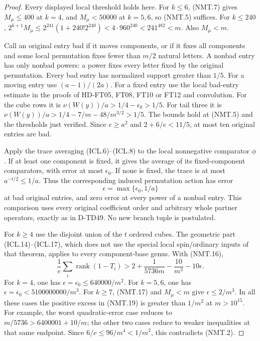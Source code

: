 \begin{proof}
Every displayed local threshold holds here.  For $k\le6$,
(NMT.7) gives $M_\mu\le400$ at $k=4$, and $M_\mu<50000$
at $k=5,6$, so (NMT.5) suffices.
For $k\le240$,
$2^{k+1}M_\mu\le2^{241}(1+240!2^{240})
<4\cdot960^{240}<241^{482}<m$.
Also $M_\mu<m$.

Call an original entry bad if it moves components, or if it
fixes all components and some local permutation fixes fewer
than $m/2$ natural letters.  A nonbad entry has only nonbad
powers: a power fixes every letter fixed by the original
permutation.  Every bad entry has normalized support greater
than $1/5$.  For a moving entry use $(a-1)/(2a)$.
For a fixed entry use the local bad-entry estimate in the
proofs of HD-FT05, FT08, FT10 or FT12 and convolution.
For the cube rows it is
$\nu(W(y))/a>1/4-\epsilon_0>1/5$.
For tail three it is
$\nu(W(y))/a>1/4-7/m-48/m^{3/2}>1/5$.
The bounds hold at (NMT.5) and the thresholds just verified.
Since $e\ge a^2$ and $2+6/e<11/5$, at most ten original
entries are bad.

Apply the trace averaging (ICL.6)--(ICL.8) to the local
nonnegative comparator $\phi$.  If at least one component
is fixed, it gives the average of its fixed-component
comparators, with error at most $\epsilon_0$.
If none is fixed, the trace is at most $a^{-t/2}\le1/a$.
Thus the corresponding induced permutation action has error
\[
                 \epsilon=\max\{\epsilon_0,1/a\}
 \tag{NMT.18}
\]
at bad original entries, and zero error at every power of
a nonbad entry.  This comparison uses every original
coefficient order and arbitrary whole partner operators,
exactly as in D-TD49.  No new branch tuple is postulated.

For $k\ge4$ use the disjoint union of the $t$ ordered cubes.
The geometric part (ICL.14)--(ICL.17), which does not use
the special local spin/ordinary inputs of that theorem,
applies to every component-base genus.  With (NMT.16),
\[
 \frac1e\sum_i\operatorname{rank}(1-T_i)
 >2+\frac1{5736m}-\frac{10}{m^3}-10\epsilon.
 \tag{NMT.19}
\]
For $k=4$, one has $\epsilon=\epsilon_0\le640000/m^2$.
For $k=5,6$, one has $\epsilon=\epsilon_0<5100000000/m^3$.
For $k\ge7$, (NMT.17) and $M_\mu<m$ give
$\epsilon\le2/m^3$.
In all these cases the positive excess in (NMT.19) is greater
than $1/m^2$ at $m>10^{15}$.
For example, the worst quadratic-error case reduces to
$m/5736>6400001+10/m$; the other two cases reduce to weaker
inequalities at that same endpoint.
Since $6/e\le96/m^4<1/m^2$, this contradicts (NMT.2).


\end{proof}
